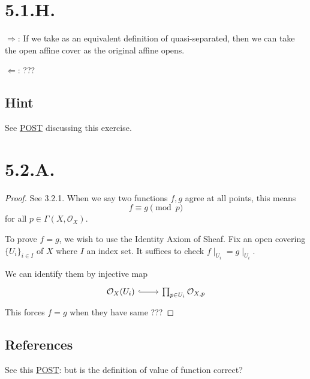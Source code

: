 \section{5.1.H.}\label{5.1.H.}

$\Rightarrow$: If we take  as an equivalent definition of quasi-separated, then we can take the open affine cover as the original affine opens. 

$\Leftarrow$: ??? 

\subsection{Hint}

See \href{https://math.stackexchange.com/questions/4625360/scheme-quasiseparated-iff-covered-by-affine-open-subsets-any-two-of-which-have}{POST} discussing this exercise. 

\section{5.2.A.}

\begin{proof}
    
See 3.2.1. When we say two functions $f,g$ agree at all points, this means 
\[f\equiv g\pmod{p}\] for all $p\in \Gamma(X,\mathcal O_X)$.    

To prove $f=g$, we wish to use the Identity Axiom of Sheaf. Fix an open covering $\{U_i\}_{i\in I}$ of $X$ where $I$ an index set. It suffices to check $f\mid_{U_i}=g\mid_{U_i}$.

We can identify them by injective map 
\[\begin{tikzcd}
	{\mathcal O_X(U_i)} & {\prod_{p\in U_i}\mathcal O_{X,p}}
	\arrow[hook, from=1-1, to=1-2]
\end{tikzcd}\]
This forces $f=g$ when they have same ???

\end{proof}

\subsection{References}

See this \href{https://math.stackexchange.com/questions/3834821/equality-of-functions-in-a-reduced-scheme}{POST}: but is the definition of value of function correct?


